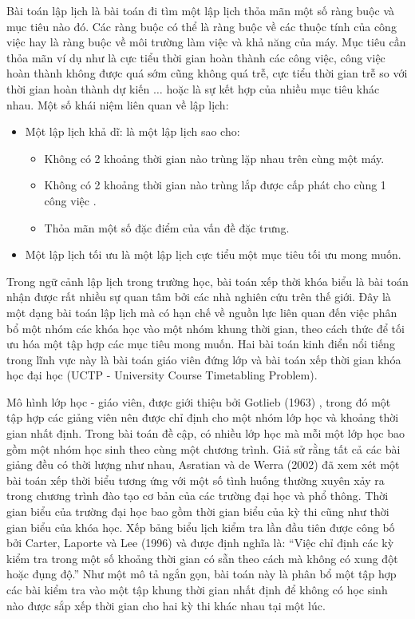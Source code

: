 \documentclass[11pt]{article}
\begin{document}
Bài toán lập lịch là bài toán đi tìm một lập lịch thỏa mãn một số ràng buộc và mục tiêu nào đó. Các ràng buộc có thể là ràng buộc về các thuộc tính của công việc hay là ràng buộc về môi trường làm việc và khả năng của máy. Mục tiêu cần thỏa mãn ví dụ như là cực tiểu thời gian hoàn thành các công việc, công việc hoàn thành không được quá sớm cũng không quá trễ, cực tiểu thời gian trễ so với thời gian hoàn thành dự kiến $\ldots$ hoặc là sự kết hợp của nhiều mục tiêu khác nhau.
Một số khái niệm liên quan về lập lịch: 

\begin{itemize}
\item Một lập lịch khả dĩ: là một lập lịch sao cho: 
  \begin{itemize}
    \item Không có 2 khoảng thời gian nào trùng lặp nhau trên cùng một máy.
    \item Không có 2 khoảng thời gian nào trùng lắp được cấp phát cho cùng 1 công việc .
    \item Thỏa mãn một số đặc điểm của vấn đề đặc trưng. 
  \end{itemize}
\item Một lập lịch tối ưu là một lập lịch cực tiểu một mục tiêu tối ưu mong muốn. 
\end{itemize}
 
Trong ngữ cảnh lập lịch trong trường học, bài toán xếp thời khóa biểu là bài toán nhận được rất nhiều sự quan tâm bởi các nhà nghiên cứu trên thế giới. Đây là một dạng bài toán lập lịch mà có hạn chế về nguồn lực liên quan đến việc phân bổ một nhóm các khóa học vào một nhóm khung thời gian, theo cách thức để tối ưu hóa một tập hợp các mục tiêu mong muốn. Hai bài toán kinh điển nổi tiếng trong lĩnh vực này là bài toán giáo viên đứng lớp và bài toán xếp thời gian khóa học đại học (UCTP - University Course Timetabling Problem).

Mô hình lớp học - giáo viên, được giới thiệu bởi Gotlieb (1963) \cite{Gotlieb:1963}, trong đó một tập hợp các giảng viên nên được chỉ định cho một nhóm lớp học và khoảng thời gian nhất định. Trong bài toán đề cập, có nhiều lớp học mà mỗi một lớp học bao gồm một nhóm học sinh theo cùng một chương trình. Giả sử rằng tất cả các bài giảng đều có thời lượng như nhau, Asratian và de Werra (2002) \cite{Asratian:deWerra:2002} đã xem xét một bài toán xếp thời biểu tương ứng với một số tình huống thường xuyên xảy ra trong chương trình đào tạo cơ bản của các trường đại học và phổ thông. Thời gian biểu của trường đại học bao gồm thời gian biểu của kỳ thi cũng như thời gian biểu của khóa học. Xếp bảng biểu lịch kiểm tra lần đầu tiên được công bố bởi Carter, Laporte và Lee (1996) \cite{Carter:al:1996} và được định nghĩa là: “Việc chỉ định các kỳ kiểm tra trong một số khoảng thời gian có sẵn theo cách mà không có xung đột hoặc đụng độ.” Như một mô tả ngắn gọn, bài toán này là phân bổ một tập hợp các bài kiểm tra vào một tập khung thời gian nhất định để không có học sinh nào được sắp xếp thời gian cho hai kỳ thi khác nhau tại một lúc.
 
\end{document}
